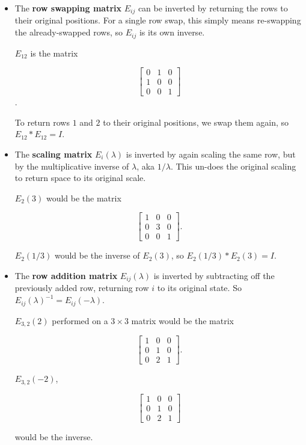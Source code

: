 \documentclass{ximera}
\begin{document}
\begin{itemize}

  \item The \textbf{row swapping matrix} $E_{ij}$ can be inverted by returning the rows to their original positions. For a single row swap, this simply means re-swapping the already-swapped rows, so $E_{ij}$ is its own inverse. 
  
  $E_{12}$ is the matrix

  \begin{equation*}
    \begin{bmatrix}
      0 & 1 & 0 \\
      1 & 0 & 0 \\
      0 & 0 & 1
    \end{bmatrix}
  \end{equation*}.

  To return rows $1$ and $2$ to their original positions, we swap them again, so $E_{12}*E_{12}=I$.

  \item The \textbf{scaling matrix} $E_{i}(\lambda)$ is inverted by again scaling the same row, but by the multiplicative inverse of $\lambda$, aka $1/\lambda$. This un-does the original scaling to return space to its original scale.
  
  $E_{2}(3)$ would be the matrix

  \begin{equation*}
    \begin{bmatrix}
      1 & 0 & 0 \\
      0 & 3 & 0 \\
      0 & 0 & 1
    \end{bmatrix}.
  \end{equation*}

  $E_{2}(1/3)$ would be the inverse of $E_{2}(3)$, so $E_{2}(1/3)*E_{2}(3)=I$.

  \item The \textbf{row addition matrix} $E_{ij}(\lambda)$ is inverted by subtracting off the previously added row, returning row $i$ to its original state. So $E_{ij}(\lambda)^{-1}=E_{ij}(-\lambda)$.
  
  $E_{3,2}(2)$ performed on a $3\times 3$ matrix would be the matrix

  \begin{equation*}
    \begin{bmatrix}
      1 & 0 & 0 \\
      0 & 1 & 0 \\
      0 & 2 & 1
    \end{bmatrix}.
  \end{equation*}

  $E_{3,2}(-2)$,

  \begin{equation*}
    \begin{bmatrix}
      1 & 0 & 0 \\
      0 & 1 & 0 \\
      0 & 2 & 1
    \end{bmatrix}
  \end{equation*}

  would be the inverse.

\end{itemize}
\end{document}
